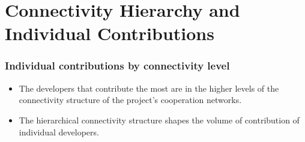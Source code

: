 \documentclass[ignorenonframetext,red,8pt,notes=hide]{beamer}
\begin{document}
\section{Connectivity Hierarchy and Individual Contributions}

\begin{frame}
\frametitle{Individual contributions by connectivity level}

\begin{itemize}
\item The developers that contribute the most are in the higher levels of the connectivity structure of the project's cooperation networks.

\item The hierarchical connectivity structure shapes the volume of contribution of individual developers.

\end{itemize}


\end{frame}
\end{document}
